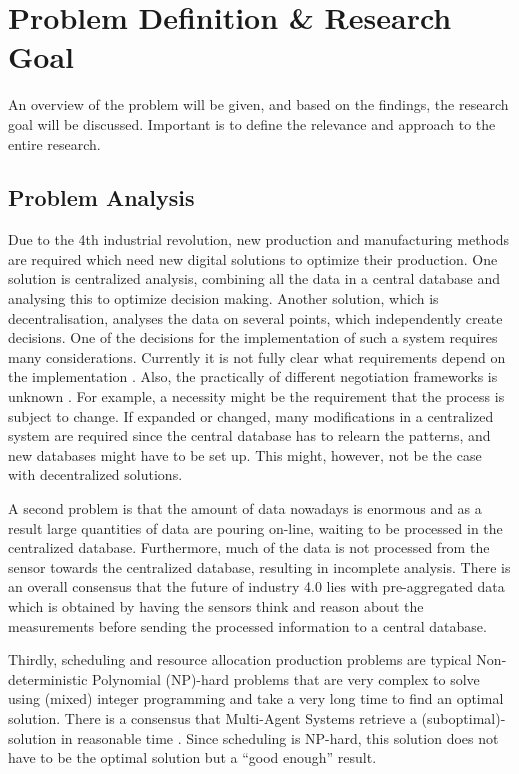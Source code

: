 \chapter{Problem Definition \& Research Goal}
\label{chp:problem}
An overview of the problem will be given, and based on the findings, the research goal will be discussed. Important is to define the relevance and approach to the entire research. 
\section{Problem Analysis}
Due to the 4th industrial revolution, new production and manufacturing methods are required which need new digital solutions to optimize their production. One solution is centralized analysis, combining all the data in a central database and analysing this to optimize decision making. Another solution, which is decentralisation, analyses the data on several points, which independently create decisions. One of the decisions for the implementation of such a system requires many considerations. Currently it is not fully clear what requirements depend on the implementation \citep{leitao2016smart}. Also, the practically of different negotiation frameworks is unknown \citep{fatima2014principles}. For example, a necessity might be the requirement that the process is subject to change. If expanded or changed, many modifications in a centralized system are required since the central database has to relearn the patterns, and new databases might have to be set up. This might, however, not be the case with decentralized solutions. %

A second problem is that the amount of data nowadays is enormous and as a result large quantities of data are pouring on-line, waiting to be processed in the centralized database. Furthermore, much of the data is not processed from the sensor towards the centralized database, resulting in incomplete analysis. There is an overall consensus that the future of industry 4.0 lies with pre-aggregated data \citep{deloitte2015connected} which is obtained by having the sensors think and reason about the measurements before sending the processed information to a central database.

Thirdly, scheduling and resource allocation production problems are typical Non-deterministic Polynomial (NP)-hard problems that are very complex to solve using (mixed) integer programming and take a very long time to find an optimal solution. There is a consensus that Multi-Agent Systems retrieve a (suboptimal)-solution in reasonable time \citep{konolige1980multiple}. Since scheduling is NP-hard, this solution does not have to be the optimal solution but a ``good enough'' result.  


